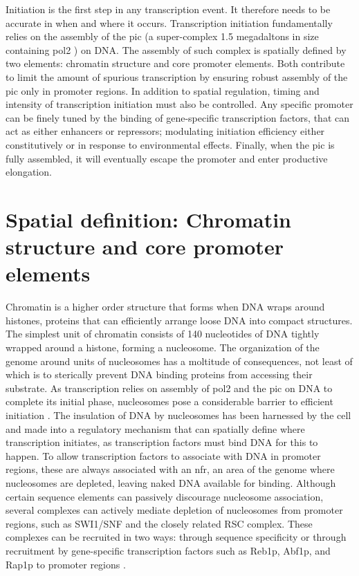 Initiation is the first step in any transcription event. 
It therefore needs to be accurate in when and where it occurs. 
Transcription initiation fundamentally relies on the assembly of the \gls{pic} (a super-complex 1.5 megadaltons in size  containing \gls{pol2} \cite{fazal:2015:realtime}) on DNA.
The assembly of such complex is spatially defined by two elements: chromatin structure and core promoter elements.
Both contribute to limit the amount of spurious transcription by ensuring robust assembly of the \gls{pic} only in promoter regions.
In addition to spatial regulation, timing and intensity of transcription initiation must also be controlled.
Any specific promoter can be finely tuned by the binding of gene-specific transcription factors, that can act as either enhancers or repressors; modulating initiation efficiency either constitutively or in response to environmental effects. 
Finally, when the \gls{pic} is fully assembled, it will eventually escape the promoter and enter productive elongation.

\singlespacing
\section{Spatial definition: Chromatin structure and core promoter elements}
\doublespacing

Chromatin is a higher order structure that forms when DNA wraps around histones, proteins that can efficiently arrange loose DNA into compact structures.
The simplest unit of chromatin consists of 140 nucleotides of DNA tightly wrapped around a histone, forming a nucleosome.
The organization of the genome around units of nucleosomes has a moltitude of consequences, not least of which is to sterically prevent DNA binding proteins from accessing their substrate. 
As transcription relies on assembly of \gls{pol2} and the \gls{pic} on DNA to complete its initial phase, nucleosomes pose a considerable barrier to efficient initiation \cite{field:2008:distinct} \cite{jiang:2009:compiled}.
The insulation of DNA by nucleosomes has been harnessed by the cell and made into a regulatory mechanism that can spatially define where transcription initiates, as transcription factors must bind DNA for this to happen. 
To allow transcription factors to associate with DNA in promoter regions, these are always associated with an \gls{nfr}, an area of the genome where nucleosomes are depleted, leaving naked DNA available for binding.
Although certain sequence elements can passively discourage nucleosome association, several complexes can actively mediate depletion of nucleosomes from promoter regions, such as SWI1/SNF and the closely related RSC complex.
These complexes can be recruited in two ways: through sequence specificity \cite{badis:2008:library, knight:2014:two} or through recruitment by gene-specific transcription factors such as Reb1p, Abf1p, and Rap1p to promoter regions \citep{floer:2010:rscnucleosome, hartley:2009:mechanisms, spain:2014:rsc, badis:2008:library}.

